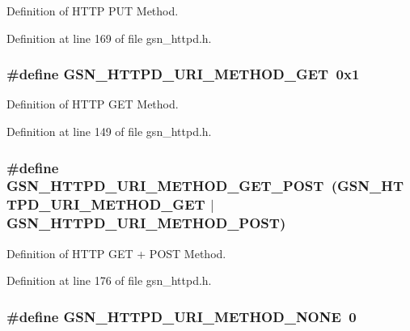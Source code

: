 Definition of HTTP PUT Method. 



Definition at line 169 of file gsn\_\-httpd.h.

\hypertarget{a00666_gacd507c9947ef6c72439a7a6b334ba992}{
\subsubsection[{GSN\_\-HTTPD\_\-URI\_\-METHOD\_\-GET}]{\setlength{\rightskip}{0pt plus 5cm}\#define GSN\_\-HTTPD\_\-URI\_\-METHOD\_\-GET~0x1}}
\label{a00666_gacd507c9947ef6c72439a7a6b334ba992}


Definition of HTTP GET Method. 



Definition at line 149 of file gsn\_\-httpd.h.

\hypertarget{a00666_ga02224e5a5226487aecd6d50f7812ed07}{
\subsubsection[{GSN\_\-HTTPD\_\-URI\_\-METHOD\_\-GET\_\-POST}]{\setlength{\rightskip}{0pt plus 5cm}\#define GSN\_\-HTTPD\_\-URI\_\-METHOD\_\-GET\_\-POST~(GSN\_\-HTTPD\_\-URI\_\-METHOD\_\-GET $|$ GSN\_\-HTTPD\_\-URI\_\-METHOD\_\-POST)}}
\label{a00666_ga02224e5a5226487aecd6d50f7812ed07}


Definition of HTTP GET + POST Method. 



Definition at line 176 of file gsn\_\-httpd.h.

\hypertarget{a00666_ga824f47b1441b0279d607862e43d2fc3e}{
\subsubsection[{GSN\_\-HTTPD\_\-URI\_\-METHOD\_\-NONE}]{\setlength{\rightskip}{0pt plus 5cm}\#define GSN\_\-HTTPD\_\-URI\_\-METHOD\_\-NONE~0}}
\label{a00666_ga824f47b1441b0279d607862e43d2fc3e}



